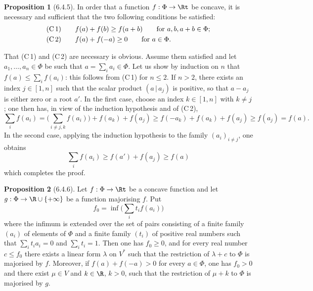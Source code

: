 \documentclass[12pt,a4paper,oneside,english]{smfart}
\makeatletter
\newcommand{\btanchor}[1]{\leavevmode\Hy@raisedlink{\hypertarget{bt:#1}{}}}
\newcommand{\btpageanchor}[1]{\Hy@raisedlink{\hypertarget{p:#1}{}}}
\newcommand{\btpage}[1]{\marginnote{p.~#1}\btpageanchor{#1}}
\newcommand{\pmark}[1]{\btpage{#1}}
\theoremstyle{definition}
\theoremstyle{bt}
\newtheorem{prop}{Proposition}
\makeatother
\begin{document}
\begin{prop}[6.4.5]\btanchor{6.4.5}
In order that a function $f:\Phi\to\Rt$ be concave, it is necessary and
sufficient that the two following conditions be satisfied:
\begin{align*}
  &\text{(C\,1)}\qquad f(a)+f(b)\geq f(a+b)\qquad\text{for }a,b,a+b\in\Phi;\\
  &\text{(C\,2)}\qquad f(a)+f(-a)\geq0\qquad\text{for }a\in\Phi.
\end{align*}
\end{prop}

That (C\,1) and (C\,2) are necessary is obvious. Assume them satisfied and
let $a_1,\dots,a_n\in\Phi$ be such that $a=\sum_i a_i\in\Phi$. Let us show
by induction on $n$ that $f(a)\leq\sum_i f(a_i)$: this follows from (C\,1)
for $n\leq2$. If $n>2$, there exists an index $j\in[1,n]$ such that the
scalar product $(a\,|\,a_j)$ is positive, so that $a-a_j$ is either zero or
a root $a'$.
\pmark{134}
In the first case, choose an index $k\in[1,n]$ with $k\neq j$; one then
has, in view of the induction hypothesis and of (C\,2),
\[
  \sum_i f(a_i)=\Big(\sum_{i\neq j,k}f(a_i)\Big)+f(a_k)+f(a_j)
   \geq f(-a_k)+f(a_k)+f(a_j)\geq f(a_j)=f(a).
\]
In the second case, applying the induction hypothesis to the family
$(a_i)_{i\neq j}$, one obtains
\[
  \sum_i f(a_i)\geq f(a')+f(a_j)\geq f(a)
\]
which completes the proof.

\begin{prop}[6.4.6]\btanchor{6.4.6}
Let $f:\Phi\to\Rt$ be a concave function and let
$g:\Phi\to\R\cup\{+\infty\}$ be a function majorising $f$. Put
\[
  f_0=\inf\Big(\sum_i t_i f(a_i)\Big)
\]
where the infimum is extended over the set of pairs consisting of a finite
family $(a_i)$ of elements of $\Phi$ and a finite family $(t_i)$ of
positive real numbers such that $\sum_i t_i a_i=0$ and $\sum_i t_i=1$.
Then one has $f_0\geq0$, and for every real number $c\leq f_0$ there exists
a linear form $\lambda$ on $V^{*}$ such that the restriction of
$\lambda+c$ to $\Phi$ is majorised by $f$. Moreover, if $f(a)+f(-a)>0$ for
every $a\in\Phi$, one has $f_0>0$ and there exist $\mu\in V$ and $k\in\R$,
$k>0$, such that the restriction of $\mu+k$ to $\Phi$ is majorised by $g$.
\end{prop}
\end{document}
